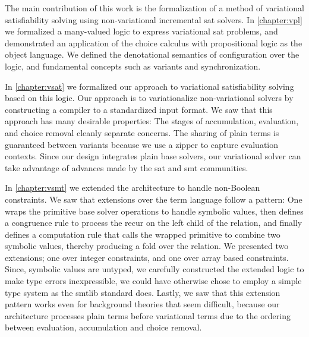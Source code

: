 \label{section:conclusion:cont-summary}

The main contribution of this work is the formalization of a method of
variational satisfiability solving using non-variational incremental \ac{sat}
solvers.
%
In \autoref{chapter:vpl} we formalized a many-valued logic to express
variational \ac{sat} problems, and demonstrated an application of the choice
calculus with propositional logic as the object language. We defined the
denotational semantics of configuration over the logic, and fundamental concepts
such as variants and synchronization.

In \autoref{chapter:vsat} we formalized our approach to variational
satisfiability solving based on this logic. Our approach is to variationalize
non-variational solvers by constructing a compiler to a standardized input
format. We saw that this approach has many desirable properties: The stages of
accumulation, evaluation, and choice removal cleanly separate concerns. The
sharing of plain terms is guaranteed between variants because we use a zipper to
capture evaluation contexts. Since our design integrates plain base solvers, our
variational solver can take advantage of advances made by the \ac{sat} and
\ac{smt} communities.
%

In \autoref{chapter:vsmt} we extended the architecture to handle non-Boolean
constraints. We saw that extensions over the term language follow a pattern: One
wraps the primitive base solver operations to handle symbolic values, then
defines a congruence rule to process the recur on the left child of the
relation, and finally defines a computation rule that calls the wrapped
primitive to combine two symbolic values, thereby producing a fold over the
relation. We presented two extensions; one over integer constraints, and one
over array based constraints. Since, symbolic values are untyped, we carefully
constructed the extended logic to make type errors inexpressible, we could have
otherwise chose to employ a simple type system as the \acl{smtlib} standard
does. Lastly, we saw that this extension pattern works even for background
theories that seem difficult, because our architecture processes plain terms
before variational terms due to the ordering between evaluation, accumulation
and choice removal.

